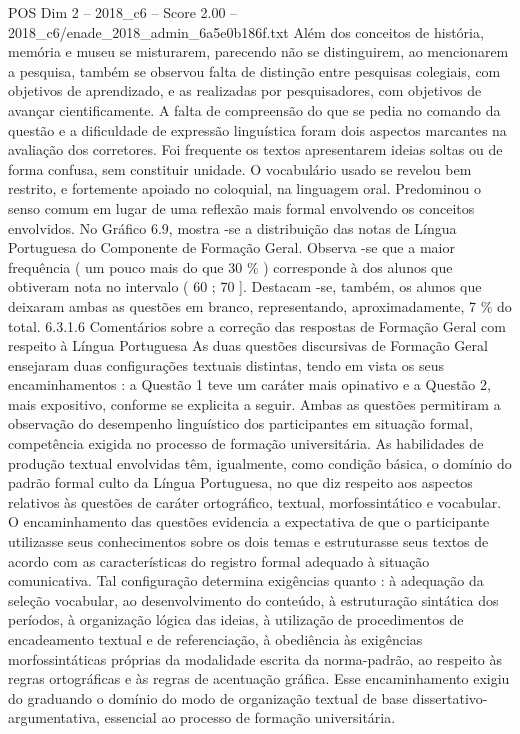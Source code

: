 \begin{textsample}{POS Dim 2 – 2018\_c6 – Score 2.00 – 2018\_c6/enade\_2018\_admin\_6a5e0b186f.txt}
Além dos conceitos de história, memória e museu se misturarem, parecendo não se distinguirem, ao mencionarem a pesquisa, também se observou falta de distinção entre pesquisas colegiais, com objetivos de aprendizado, e as realizadas por pesquisadores, com objetivos de avançar cientificamente.
A falta de compreensão do que se pedia no comando da questão e a dificuldade de expressão linguística foram dois aspectos marcantes na avaliação dos corretores.
Foi frequente os textos apresentarem ideias soltas ou de forma confusa, sem constituir unidade.
O vocabulário usado se revelou bem restrito, e fortemente apoiado no coloquial, na linguagem oral.
Predominou o senso comum em lugar de uma reflexão mais formal envolvendo os conceitos envolvidos.
No Gráfico 6.9, mostra -se a distribuição das notas de Língua Portuguesa do Componente de Formação Geral.
Observa -se que a maior frequência ( um pouco mais do que 30 \% ) corresponde à dos alunos que obtiveram nota no intervalo ( 60 ; 70 ].
Destacam -se, também, os alunos que deixaram ambas as questões em branco, representando, aproximadamente, 7 \% do total. 6.3.1.6 Comentários sobre a correção das respostas de Formação Geral com respeito à Língua Portuguesa As duas questões discursivas de Formação Geral ensejaram duas configurações textuais distintas, tendo em vista os seus encaminhamentos : a Questão 1 teve um caráter mais opinativo e a Questão 2, mais expositivo, conforme se explicita a seguir.
Ambas as questões permitiram a observação do desempenho linguístico dos participantes em situação formal, competência exigida no processo de formação universitária.
As habilidades de produção textual envolvidas têm, igualmente, como condição básica, o domínio do padrão formal culto da Língua Portuguesa, no que diz respeito aos aspectos relativos às questões de caráter ortográfico, textual, morfossintático e vocabular.
O encaminhamento das questões evidencia a expectativa de que o participante utilizasse seus conhecimentos sobre os dois temas e estruturasse seus textos de acordo com as características do registro formal adequado à situação comunicativa.
Tal configuração determina exigências quanto : à adequação da seleção vocabular, ao desenvolvimento do conteúdo, à estruturação sintática dos períodos, à organização lógica das ideias, à utilização de procedimentos de encadeamento textual e de referenciação, à obediência às exigências morfossintáticas próprias da modalidade escrita da norma-padrão, ao respeito às regras ortográficas e às regras de acentuação gráfica.
Esse encaminhamento exigiu do graduando o domínio do modo de organização textual de base dissertativo-argumentativa, essencial ao processo de formação universitária.

\end{textsample}
